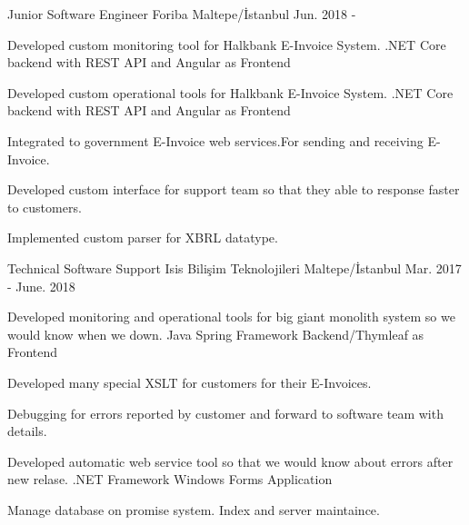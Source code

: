 

\begin{cventries}


  \cventry
    {Junior Software Engineer} %
    {Foriba} %
    {Maltepe/İstanbul} %
    {Jun. 2018 - } %
    {
      \begin{cvitems} %
        \item {Developed custom monitoring tool for Halkbank E-Invoice System. .NET Core backend with REST API and Angular as Frontend }
        \item {Developed custom operational tools for Halkbank E-Invoice System. .NET Core backend with REST API and Angular as Frontend}
        \item {Integrated to government E-Invoice web services.For sending and receiving E-Invoice.}
        \item {Developed custom interface for support team so that they able to response faster to customers.}
        \item {Implemented custom parser for XBRL datatype.}
      \end{cvitems}
    }


  \cventry
    {Technical Software Support} %
    {Isis Bilişim Teknolojileri} %
    {Maltepe/İstanbul} %
    {Mar. 2017 - June. 2018} %
    {
      \begin{cvitems} %
        \item {Developed monitoring and operational tools for big giant monolith system so we would know when we down. Java Spring Framework Backend/Thymleaf as Frontend}
        \item {Developed many special XSLT for customers for their E-Invoices.}        
        \item {Debugging for errors reported by customer and forward to software team with details.}        
        \item {Developed automatic web service tool so that we would know about errors after new relase. .NET Framework Windows Forms Application}
        \item {Manage database on promise system. Index and server maintaince.}
      \end{cvitems}
    }





\end{cventries}
